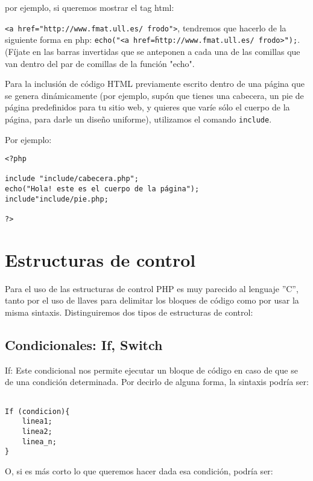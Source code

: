 por ejemplo, si queremos mostrar el tag html:

{\tt   <a    href="http://www.fmat.ull.es/~frodo">},   tendremos   que
hacerlo   de    la   siguiente    forma   en   php:    {\tt   echo("<a
href=\"http://www.fmat.ull.es/~frodo\">");}.  (Fíjate  en  las  barras
invertidas que se anteponen a cada  una de las comillas que van dentro
del par de comillas de la función "echo".

Para la  inclusión de  código HTML previamente  escrito dentro  de una
página que se genera dinámicamente  (por ejemplo, supón que tienes una
cabecera, un pie  de página predefinidos para tu sitio  web, y quieres
que varíe sólo el cuerpo de la página, para darle un diseño uniforme),
utilizamos el comando {\tt include}.

Por ejemplo:

\begin{verbatim}
<?php

include "include/cabecera.php";
echo("Hola! este es el cuerpo de la página");
include"include/pie.php;

?>

\end{verbatim}


\section{Estructuras de control}

Para  el uso  de las  estructuras de  control PHP  es muy  parecido al
lenguaje ''C'', tanto por el uso  de llaves para delimitar los bloques
de código como por usar la misma sintaxis. Distinguiremos dos tipos de
estructuras de control:

\subsection{Condicionales: If, Switch}

If: Este condicional nos permite ejecutar  un bloque de código en caso
de que se  de una condición determinada. Por decirlo  de alguna forma,
la sintaxis podría ser:

\begin{verbatim}

If (condicion){
	linea1;
	linea2;
	linea_n;
}

\end{verbatim}

O, si es más corto lo que queremos hacer dada esa condición, podría ser:

